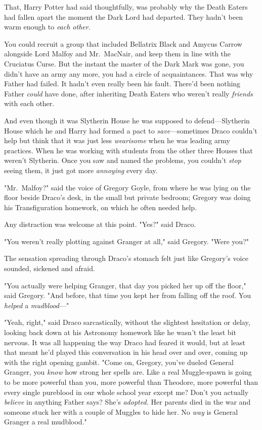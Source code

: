 That, Harry Potter had said thoughtfully, was probably why the Death Eaters had
fallen apart the moment the Dark Lord had departed. They hadn't been warm
enough to \emph{each other}.

You could recruit a group that included Bellatrix Black and Amycus Carrow
alongside Lord Malfoy and Mr.~MacNair, and keep them in line with the Cruciatus
Curse. But the instant the master of the Dark Mark was gone, you didn't have an
army any more, you had a circle of acquaintances. That was why Father had
failed. It hadn't even really been his fault. There'd been nothing Father
\emph{could} have done, after inheriting Death Eaters who weren't really
\emph{friends} with each other.

And even though it was Slytherin House he was supposed to defend---Slytherin
House which he and Harry had formed a pact to \emph{save}---sometimes Draco
couldn't help but think that it was just less \emph{wearisome} when he was
leading army practices. When he was working with students from the other three
Houses that weren't Slytherin. Once you saw and named the problems, you
couldn't \emph{stop} seeing them, it just got more \emph{annoying} every day.

"Mr.~Malfoy?" said the voice of Gregory Goyle, from where he was lying on the
floor beside Draco's desk, in the small but private bedroom; Gregory was doing
his Transfiguration homework, on which he often needed help.

Any distraction was welcome at this point. "Yes?" said Draco.

"You weren't really plotting against Granger at all," said Gregory. "Were you?"

The sensation spreading through Draco's stomach felt just like Gregory's voice
sounded, sickened and afraid.

"You actually were helping Granger, that day you picked her up off the floor,"
said Gregory. "And before, that time you kept her from falling off the roof.
You \emph{helped} a \emph{mudblood}---"

"Yeah, right," said Draco sarcastically, without the slightest hesitation or
delay, looking back down at his Astronomy homework like he wasn't the least bit
nervous. It was all happening the way Draco had feared it would, but at least
that meant he'd played this conversation in his head over and over, coming up
with the right opening gambit. "Come on, Gregory, you've dueled General
Granger, you \emph{know} how strong her spells are. Like a real Muggle-spawn is
going to be more powerful than you, more powerful than Theodore, more powerful
than every single pureblood in our whole school year except me? Don't you
actually \emph{believe} in anything Father says? She's \emph{adopted.} Her
parents died in the war and someone stuck her with a couple of Muggles to hide
her. No \emph{way} is General Granger a real mudblood."

